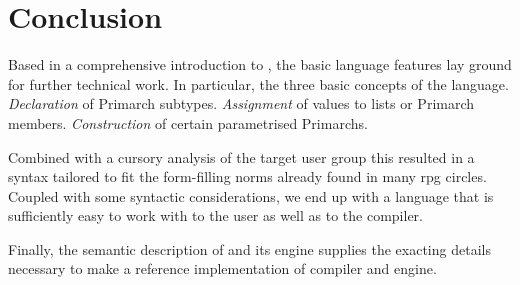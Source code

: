 \section{Conclusion}

Based in a comprehensive introduction to \langname{}, the basic language features lay ground for further technical work. In particular, the three basic concepts of the language. \emph{Declaration} of Primarch subtypes. \emph{Assignment} of values to lists or Primarch members. \emph{Construction} of certain parametrised Primarchs.

Combined with a cursory analysis of the target user group this resulted in a syntax tailored to fit the form-filling norms already found in many \ac{rpg} circles. Coupled with some syntactic considerations, we end up with a language that is sufficiently easy to work with to the user as well as to the compiler.

Finally, the semantic description of \langname{} and its engine supplies the exacting details necessary to make a reference implementation of compiler and engine. 